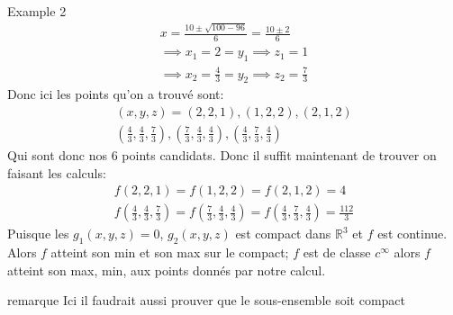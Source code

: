 \begin{parag}{Example 2}
\begin{align*} 
    x = \frac{10 \pm \sqrt{100 - 96}}{6} =  \frac{10 \pm 2}{6} \\
    \implies x_1 =  2 =  y_1 \implies z_1 =  1\\
    \implies x_2 =  \frac{4}{3} =  y_2 \implies z_2 =  \frac{7}{3}
\end{align*}
Donc ici les points qu'on a trouvé sont:
\begin{align*} \left(x, y, z\right) =  \left(2, 2, 1\right), \left(1, 2, 2\right), \left(2, 1, 2\right)\\
\left(\frac{4}{3}, \frac{4}{3}, \frac{7}{3}\right), \left(\frac{7}{3}, \frac{4}{3}, \frac{4}{3}\right), \left(\frac{4}{3}, \frac{7}{3}, \frac{4}{3}\right)\end{align*}
Qui sont donc nos 6 points candidats. Donc il suffit maintenant de trouver on faisant les calculs:
\begin{align*} 
    f\left(2, 2, 1\right) =  f\left(1, 2, 2\right) =  f\left(2, 1, 2\right) =  4\\
f\left(\frac{4}{3}, \frac{4}{3}, \frac{7}{3}\right) = f\left(\frac{7}{3}, \frac{4}{3}, \frac{4}{3}\right) =f \left(\frac{4}{3}, \frac{7}{3}, \frac{4}{3}\right) = \frac{112}{3}
\end{align*}
Puisque les $g_1\left(x, y, z\right) =  0$, $g_2\left(x, y, z\right)$ est compact dans $\mathbb{R}^{3}$ et $f$ est continue. Alors $f$ atteint son min et son max sur le  compact; $f$ est de classe $c^{\infty}$ alors $f$ atteint son max, min, aux points donnés par notre calcul.\\
\begin{subparag}{remarque}
    Ici il faudrait aussi prouver que le sous-ensemble soit compact
\end{subparag}

\end{parag}
